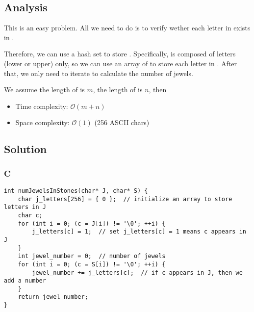 \subsection*{Analysis}
This is an easy problem. All we need to do is to verify wether each letter in  exists in .

Therefore, we can use a hash set to store . Specifically,  is composed of letters (lower or upper) only, so we can use an array of  to store each letter in . After that, we only need to iterate  to calculate the number of jewels.

We assume the length of  is $m$, the length of  is $n$, then
\begin{itemize}
    \item Time complexity: $\mathcal{O}(m + n)$
    \item Space complexity: $\mathcal{O}(1)$ (256 ASCII chars)
\end{itemize}

\subsection*{Solution}
\subsubsection{C}
\begin{verbatim}
int numJewelsInStones(char* J, char* S) {
    char j_letters[256] = { 0 };  // initialize an array to store letters in J
    char c;
    for (int i = 0; (c = J[i]) != '\0'; ++i) {
        j_letters[c] = 1;  // set j_letters[c] = 1 means c appears in J
    }
    int jewel_number = 0;  // number of jewels
    for (int i = 0; (c = S[i]) != '\0'; ++i) {
        jewel_number += j_letters[c];  // if c appears in J, then we add a number
    }
    return jewel_number;
}
\end{verbatim}

\newpage

